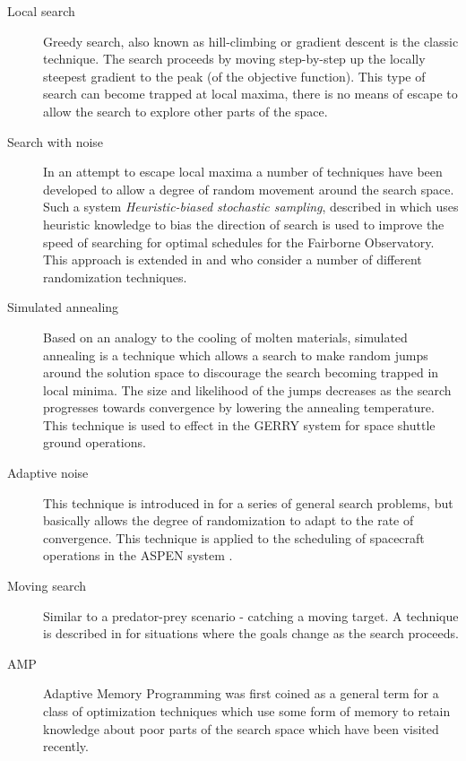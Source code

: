 \documentclass[12pt,a4paper]{article}
\begin{document}
\begin{description}
\item[Local search]
Greedy search, also known as hill-climbing or gradient descent is the classic technique. The search proceeds by moving step-by-step up the locally steepest gradient to the peak (of the objective function). This type of search can become trapped at local maxima, there is no means of escape to allow the search to explore other parts of the space.

\item[Search with noise]
In an attempt to escape local maxima a number of techniques have been developed to allow a degree of random movement around the search space. Such a system \emph{Heuristic-biased stochastic sampling}, described in \citep{bresina96hbss} which uses heuristic knowledge to bias the direction of search is used to improve the speed of searching for optimal schedules for the Fairborne Observatory. This approach is extended in \citep{cicirello02amplification} and \citep{kramer04swapping} who consider a number of different randomization techniques. 

\item[Simulated annealing]
Based on an analogy to the cooling of molten materials, simulated annealing is a technique which allows a search to make random jumps around the solution space to discourage the search becoming trapped in local minima. The size and likelihood of the jumps decreases as the search progresses towards convergence by lowering the annealing temperature. This technique is used to effect in the GERRY system \citep{zweben94scheduling} for space shuttle ground operations.

\item[Adaptive noise]
This technique is introduced in \citep{hoos02adaptive} for a series of general search problems, but basically allows the degree of randomization to adapt to the rate of convergence. This technique is applied to the scheduling of spacecraft operations in the ASPEN system \citep{fukunaga04robust} .

\item[Moving search]
Similar to a predator-prey scenario - catching a moving target. A technique is described in \citep{yokoo99search} for situations where the goals change as the search proceeds.


\item[AMP]
Adaptive Memory Programming \citep{taillard98adaptive} was first coined as a general term for a class of optimization techniques which use some form of memory to retain knowledge about poor parts of the search space which have been visited recently.


\end{description}
\end{document}
